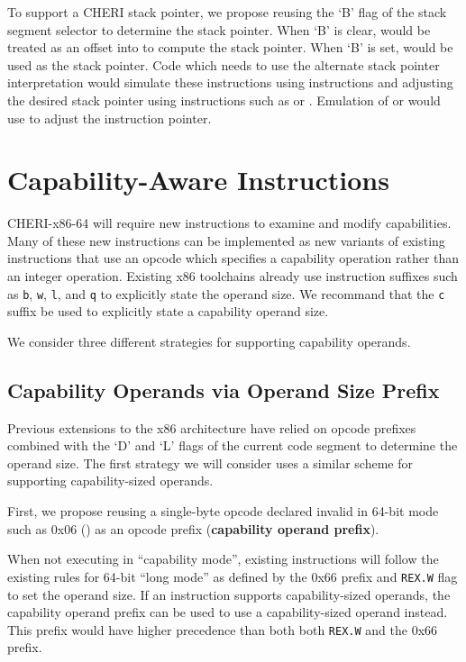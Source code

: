 To support a CHERI stack pointer, we propose reusing the `B' flag of
the stack segment selector to determine the stack pointer.  When `B'
is clear, \RSP{} would be treated as an offset into \DDC{} to compute
the stack pointer.  When `B' is set, \CSP{} would be used as the stack
pointer.  Code which needs to use the alternate stack pointer
interpretation would simulate these instructions using 
instructions and adjusting the desired stack pointer using
instructions such as  or .  Emulation of
 or  would use  to
adjust the instruction pointer.

\section{Capability-Aware Instructions}

CHERI-x86-64 will require new instructions to examine and modify
capabilities.  Many of these new instructions can be implemented as
new variants of existing instructions that use an opcode which
specifies a capability operation rather than an integer operation.
Existing x86 toolchains already use instruction suffixes such as
\texttt{b}, \texttt{w}, \texttt{l}, and \texttt{q} to explicitly state
the operand size.  We recommand that the \texttt{c} suffix be used to
explicitly state a capability operand size.

We consider three different strategies for supporting capability
operands.

\subsection{Capability Operands via Operand Size Prefix}

Previous extensions to the x86 architecture have relied on opcode
prefixes combined with the `D' and `L' flags of the current code
segment to determine the operand size.  The first strategy we
will consider uses a similar
scheme for supporting capability-sized operands.

First, we propose reusing a single-byte opcode declared invalid in
64-bit mode such as 0x06 () as an opcode prefix
(\textbf{capability operand prefix}).

When not executing in ``capability mode'', existing instructions will
follow the existing rules for 64-bit ``long mode'' as defined by the
0x66 prefix and \texttt{REX.W} flag to set the operand size.  If an
instruction supports capability-sized operands, the capability operand
prefix can be used to use a capability-sized operand instead.  This
prefix would have higher precedence than both both \texttt{REX.W} and
the 0x66 prefix.

